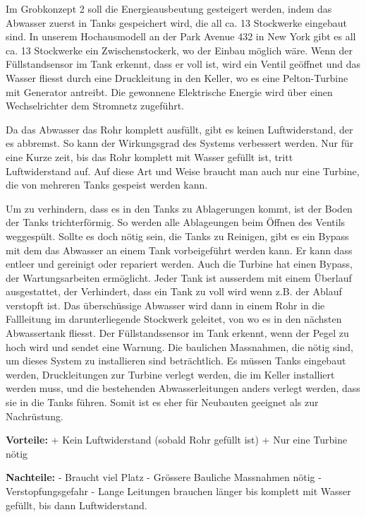 Im Grobkonzept 2 soll die Energieausbeutung gesteigert werden, indem das Abwasser zuerst in Tanks gespeichert wird, die all ca. 13 Stockwerke eingebaut sind. In unserem Hochausmodell an der Park Avenue 432 in New York gibt es all ca. 13 Stockwerke ein Zwischenstockerk, wo der Einbau möglich wäre. Wenn der Füllstandsensor im Tank erkennt, dass er voll ist, wird ein Ventil geöffnet und das Wasser fliesst durch eine Druckleitung in den Keller, wo es eine Pelton-Turbine mit Generator antreibt. Die gewonnene Elektrische Energie wird über einen Wechselrichter dem Stromnetz zugeführt. 

Da das Abwasser das Rohr komplett ausfüllt, gibt es keinen Luftwiderstand, der es abbremst. So kann der Wirkungsgrad des Systems verbessert werden. Nur für eine Kurze zeit, bis das Rohr komplett mit Wasser gefüllt ist, tritt Luftwiderstand auf. Auf diese Art und Weise braucht man auch nur eine Turbine, die von mehreren Tanks gespeist werden kann. 

Um zu verhindern, dass es in den Tanks zu Ablagerungen kommt, ist der Boden der Tanks trichterförmig. So werden alle Ablageungen beim Öffnen des Ventils weggespült. Sollte es doch nötig sein, die Tanks zu Reinigen, gibt es ein Bypass mit dem das Abwasser an einem Tank vorbeigeführt werden kann. Er kann dass entleer und gereinigt oder repariert werden. Auch die Turbine hat einen Bypass, der Wartungsarbeiten ermöglicht.
Jeder Tank ist ausserdem mit einem Überlauf ausgestattet, der Verhindert, dass ein Tank zu voll wird wenn z.B. der Ablauf verstopft ist. Das überschüssige Abwasser wird dann in einem Rohr in die Fallleitung im darunterliegende Stockwerk geleitet, von wo es in den nächsten Abwassertank fliesst. Der Füllstandssensor im Tank erkennt, wenn der Pegel zu hoch wird und sendet eine Warnung.
Die baulichen Massnahmen, die nötig sind, um dieses System zu installieren sind beträchtlich. Es müssen Tanks eingebaut werden, Druckleitungen zur Turbine verlegt werden, die im Keller installiert werden muss, und die bestehenden Abwasserleitungen anders verlegt werden, dass sie in die Tanks führen. Somit ist es eher für Neubauten geeignet als zur Nachrüstung.

\textbf{Vorteile:} 									\newline
+	Kein Luftwiderstand (sobald Rohr gefüllt ist)	\newline
+	Nur eine Turbine nötig							\newline

\textbf{Nachteile:}									\newline
-	Braucht viel Platz 								\newline
-	Grössere Bauliche Massnahmen nötig				\newline
-	Verstopfungsgefahr 								\newline
-	Lange Leitungen brauchen länger bis komplett mit Wasser gefüllt, bis dann Luftwiderstand.
